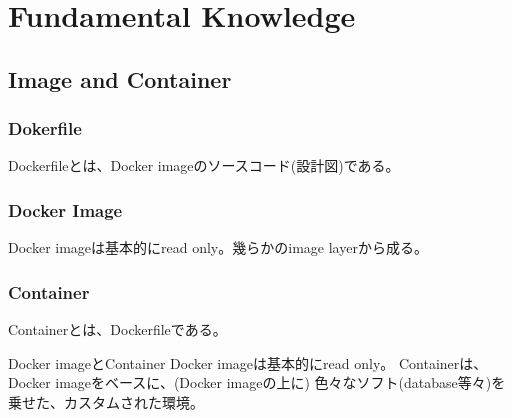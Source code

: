 \documentclass[10pt,a4j,openany,dvipdfmx]{jsarticle}
\begin{document}
\section{Fundamental Knowledge} %
\label{sec:fundamental_knowledge}

\subsection{Image and Container} %
\label{sub:image_and_container}

\subsubsection{Dokerfile} %
\label{ssub:dokerfile}


\begin{tcolorbox}[
title=Dockerfile, fonttitle=\bfseries]
Dockerfileとは、Docker imageのソースコード(設計図)である。
\end{tcolorbox}


\subsubsection{Docker Image} %
\label{ssub:docker_image}


\begin{tcolorbox}[
title=Docker Image, fonttitle=\bfseries]
Docker imageは基本的にread only。幾らかのimage layerから成る。
\end{tcolorbox}


\subsubsection{Container} %
\label{ssub:container}


\begin{tcolorbox}[
title=Container, fonttitle=\bfseries]
Containerとは、Dockerfileである。
\end{tcolorbox}

\begin{skybox}{Docker imageとContainer}
Docker imageは基本的にread only。
Containerは、Docker imageをベースに、(Docker imageの上に) 色々なソフト(database等々)を乗せた、カスタムされた環境。
\end{skybox}






\end{document}
